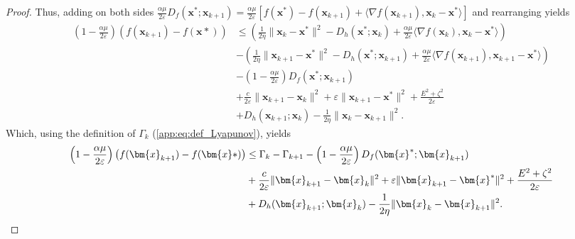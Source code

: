 \documentclass{article}
\def\eps{{\varepsilon}}
\def\vx{{\bm{x}}}
\theoremstyle{plain}
\theoremstyle{definition}
\theoremstyle{remark}
\begin{document}
\begin{proof}
    Thus, adding on both sides $\frac{\alpha \mu}{2\eps}D_f(\vx^*;\vx_{k+1}) = \frac{\alpha \mu}{2\eps}[f(\vx^*) - f(\vx_{k+1}) + \langle \nabla f(\vx_{k+1}), \vx_k - \vx^* \rangle]$ and rearranging yields
    \begin{align*}
         \left(1 - \frac{\alpha \mu}{2 \eps}\right)\left(f(\vx_{k+1}) - f(\vx*)\right) &\le
         \left(\frac{1}{2\eta}\|\vx_{k}- \vx^*\|^2 - D_{h}(\vx^*;\vx_{k}) + \frac{\alpha \mu}{2 \eps} \langle \nabla f(\vx_k),\vx_k - \vx^*\rangle\right) \\
         &- \left(\frac{1}{2\eta}\|\vx_{k+1}- \vx^*\|^2 - D_{h}(\vx^*;\vx_{k+1}) + \frac{\alpha \mu}{2 \eps} \langle \nabla f(\vx_{k+1}),\vx_{k+1} - \vx^*\rangle \right)\\
         &- \left(1 - \frac{\alpha \mu}{2 \eps}\right) D_f(\vx^*;\vx_{k+1})\\
        & + \frac{c}{2\eps}\|\vx_{k+1} - \vx_k\|^2 + \eps\|\vx_{k+1}-\vx^*\|^2 +  \frac{E^2 + \zeta^2}{2\eps} \\
        & + D_{h}(\vx_{k+1};\vx_k ) - \frac{1}{2\eta}\|\vx_{k} - \vx_{k+1}\|^2 . 
    \end{align*}
    Which, using the definition of $\Gamma_k$ (\cref{app:eq:def_Lyapunov}), yields
    \begin{align}
         \left(1 - \frac{\alpha \mu}{2 \eps}\right)\left(f(\vx_{k+1}) - f(\vx*)\right) &\le \Gamma_k - \Gamma_{k+1} - \left(1 - \frac{\alpha \mu}{2 \eps}\right) D_f(\vx^*;\vx_{k+1}) \notag\\
    & + \frac{c}{2\eps}\|\vx_{k+1} - \vx_k\|^2 + \eps\|\vx_{k+1}-\vx^*\|^2 +  \frac{E^2 + \zeta^2}{2\eps} \notag\\
    & + D_{h}(\vx_{k+1};\vx_k ) - \frac{1}{2\eta}\|\vx_{k} - \vx_{k+1}\|^2. \label{app:eq:decomposition_withlyap_1}
    \end{align}
    

\end{proof}
\end{document}
